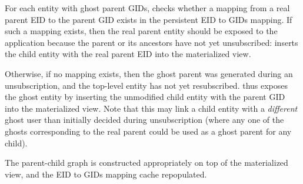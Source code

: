 For each entity with ghost parent GIDs, \name checks whether a mapping
from a real parent EID to the parent GID exists in the persistent EID to GIDs mapping. 
If such a mapping exists, then the real parent entity should be exposed to the application because
the parent or its ancestors have not yet unsubscribed: \name inserts the child entity with the real parent
EID into the materialized view.

Otherwise, if no mapping exists, then the ghost parent was generated during an unsubscription, and
the top-level entity has not yet resubscribed. \name thus exposes the ghost entity by inserting the
unmodified child entity with the parent GID into the materialized view.
Note that this may link a child entity with a \emph{different} ghost user than initially decided
during unsubscription (where any one of the ghosts corresponding to the real parent could be used as
a ghost parent for any child). 

The parent-child graph is constructed appropriately on top of the materialized view, and the EID to
GIDs mapping cache repopulated.

\fi

